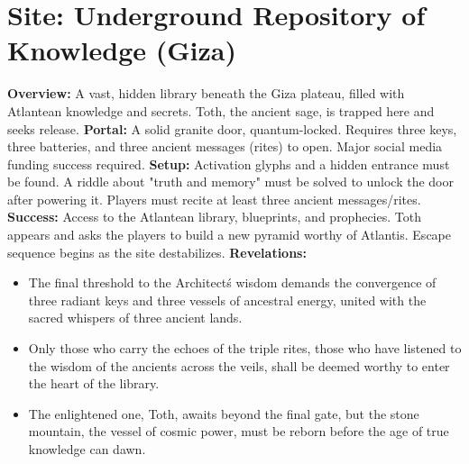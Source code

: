 \documentclass[12pt]{article}
\begin{document}
\hrulefill

\section*{Site: Underground Repository of Knowledge (Giza)}
\textbf{Overview:}
A vast, hidden library beneath the Giza plateau, filled with Atlantean knowledge and secrets. Toth, the ancient sage, is trapped here and seeks release.
\textbf{Portal:}
A solid granite door, quantum-locked. Requires three keys, three batteries, and three ancient messages (rites) to open. Major social media funding success required.
\textbf{Setup:}
Activation glyphs and a hidden entrance must be found. A riddle about "truth and memory" must be solved to unlock the door after powering it. Players must recite at least three ancient messages/rites.
\textbf{Success:}
Access to the Atlantean library, blueprints, and prophecies. Toth appears and asks the players to build a new pyramid worthy of Atlantis. Escape sequence begins as the site destabilizes.
\textbf{Revelations:}
\begin{itemize}
  \item The final threshold to the Architect\'s wisdom demands the convergence of three radiant keys and three vessels of ancestral energy, united with the sacred whispers of three ancient lands.
  \item Only those who carry the echoes of the triple rites, those who have listened to the wisdom of the ancients across the veils, shall be deemed worthy to enter the heart of the library.
  \item The enlightened one, Toth, awaits beyond the final gate, but the stone mountain, the vessel of cosmic power, must be reborn before the age of true knowledge can dawn.
\end{itemize}

\hrulefill
\end{document}
